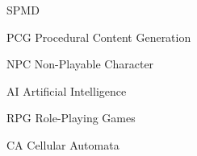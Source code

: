 
\begin{listofabbrv}{SPMD}
  \item[PCG] Procedural Content Generation
  \item[NPC] Non-Playable Character
  \item[AI] Artificial Intelligence
  \item[RPG] Role-Playing Games
  \item[CA] Cellular Automata
\end{listofabbrv}